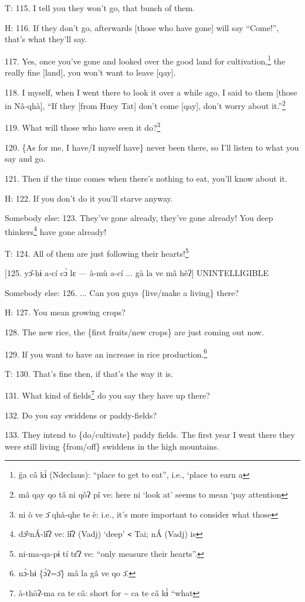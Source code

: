 T: 115. I tell you they won't go, that bunch of them.

H: 116. If they don't go, afterwards [those who have gone] will say ``Come!'',
that's what they'll say.

117. Yes, once you've gone and looked over the good land for cultivation,\footnote{g̈a câ kɨ̀ (Ndeclaus): ``place to get to eat'', i.e., `place to earn a} the
really fine [land], you won't want to leave [qay].

118. I myself, when I went there to look it over a while ago, I said to them [those
in Nâ-qhà], ``If they [from Huey Tat] don't come [qay], don't worry about it.''\footnote{mâ qay qo tâ ni qôʔ pî ve: here ni `look at' seems to mean `pay attention}

119. What will those who have seen it do?\footnote{ni ò ve ɔ̄ qhà-qhe te è: i.e., it's more important to consider what those}

120. \{As for me, I have/I myself have\} never been there, so I'll listen to what
you say and go.

121. Then if the time comes when there's nothing to eat, you'll know about it.

H: 122. If you don't do it you'll starve anyway.

Somebody else: 123. They've gone already, they've gone already! You deep thinkers\footnote{dɔ̂꞊nÁ-lɨ̂ʔ ve: lɨ̂ʔ (Vadj) `deep' \texttt{<} Tai; nÁ (Vadj) is}
have gone already!

T: 124. All of them are just following their hearts!\footnote{ni-ma-qa-pɨ tí tɛ̂ʔ ve: ``only measure their hearts''.}

[125. yɔ̂-hɨ a-cí cɔ̀ lɛ --- à-mù a-cí ... gà la ve mâ hêʔ] UNINTELLIGIBLE

Somebody else: 126. ... Can you guys \{live/make a living\} there?

H: 127. You mean growing crops?

128. The new rice, the \{first fruits/new crops\} are just coming out now.

129. If you want to have an increase in rice production.\footnote{nɔ̀-hɨ \{ɔ̀ʔ=ɔ̄\} mâ la gâ ve qo ɔ̄.}

T: 130. That's fine then, if that's the way it is.

131. What kind of fields\footnote{à-thòʔ-ma ca te câ: short for \textasciitilde{} ca te câ kɨ̀ ``what} do you say they have up there?

132. Do you say swiddens or paddy-fields?

133. They intend to \{do/cultivate\} paddy fields. The first year I went there
they were still living \{from/off\} swiddens in the high mountains.

